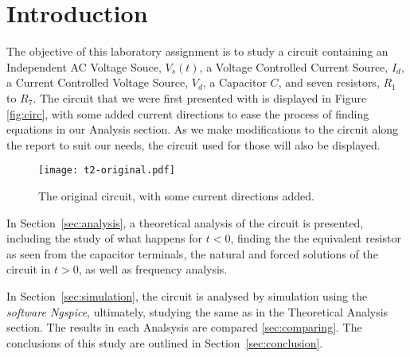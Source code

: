 \newpage
\section{Introduction}
\label{sec:introduction}

The objective of this laboratory assignment is to study a circuit containing an Independent AC Voltage Souce, $V_s(t)$, a Voltage Controlled Current Source, $I_d$, a Current Controlled Voltage Source, $V_d$, a Capacitor $C$, and seven resistors, $R_1$ to $R_7$. The circuit that we were first presented with is displayed in Figure \ref{fig:circ}, with some added current directions to ease the process of finding equations in our Analysis section. As we make modifications to the circuit along the report to suit our needs, the circuit used for those will also be displayed.

\begin{figure}[h] \centering
\texttt{[image: t2-original.pdf]}
\caption{The original circuit, with some current directions added.}
\label{fig1}
\end{figure}

In Section~\ref{sec:analysis}, a theoretical analysis of the circuit is
presented, including the study of what happens for $t<0$, finding the the equivalent resistor as seen from the capacitor
terminals, the natural and forced solutions of the circuit in $t>0$, as well as frequency analysis.

In Section~\ref{sec:simulation}, the circuit is analysed by
simulation using the \textit{software Ngspice}, ultimately, studying the same as in the Theoretical Analysis section.
The results in each Analsysis are compared \ref{sec:comparing}.
The conclusions of this study are outlined in
Section~\ref{sec:conclusion}.
